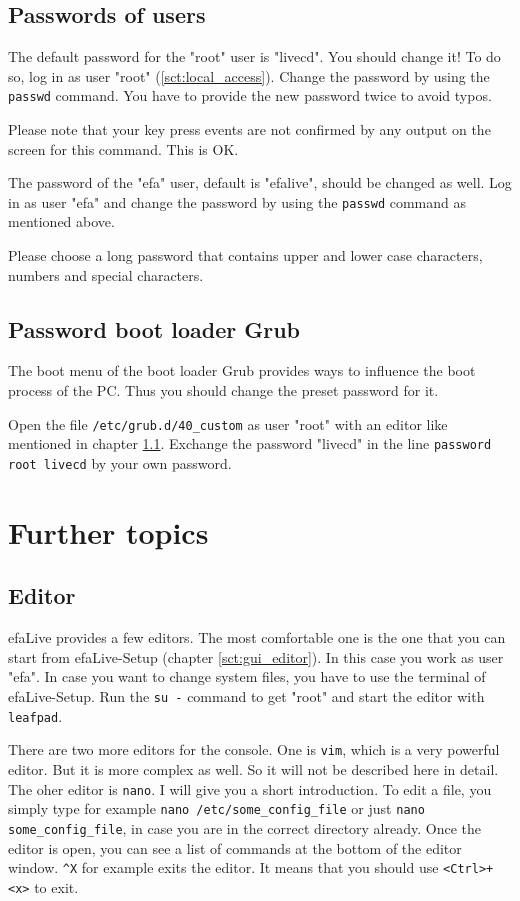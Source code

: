 \documentclass[a4paper,12pt,twoside]{article}
\begin{document}
\subsection{Passwords of users}
\label{sct:password_admin}
The default password for the "root" user is
"livecd". You should change it! To do so,
log in as user "root" (\ref{sct:local_access}). Change the
password by using the \texttt{passwd} command. You
have to provide the new password twice to avoid typos.

Please note that your key press events are not confirmed by any output
on the screen for this command. This is OK.

The password of the "efa" user, default is "efalive", should be changed as well. 
Log in as user "efa" and change the password by using the \texttt{passwd} command
as mentioned above.

Please choose a long password that contains upper and lower case
characters, numbers and special characters.


\subsection{Password boot loader Grub}
\label{sct:password_grub}
The boot menu of the boot loader Grub \cite{GRB1} provides ways to
influence the boot process of the PC. Thus you should change the preset
password for it.

Open the file \texttt{/etc/grub.d/40\_custom} as user
"root" with an editor like mentioned in
chapter \ref{sct:editor}. Exchange the password "livecd"
in the line \texttt{password root livecd} by your
own password.


\section{Further topics}
\label{sct:further_topics}
\subsection{Editor}
\label{sct:editor}
efaLive provides a few editors. The
most comfortable one is the one that you can start from efaLive-Setup
(chapter \ref{sct:gui_editor}). In this case you work as user
"efa". In case you want to change system
files, you have to use the terminal of efaLive-Setup. Run the
\texttt{su -} command to get
"root" and start the editor with
\texttt{leafpad}. 

There are two more editors for the console. One is
\texttt{vim}, which is a very powerful editor. But
it is more complex as well. So it will not be described here in detail.
The oher editor is \texttt{nano}. I will give you
a short introduction. To edit a file, you simply type for example
\texttt{nano /etc/some\_config\_file} or
just \texttt{nano some\_config\_file}, in case you are
in the correct directory already. Once the editor is open, you can see
a list of commands at the bottom of the editor window.
\texttt{\^{}X} for example exits the editor. It
means that you should use
\texttt{{\textless}Ctrl{\textgreater}+{\textless}x{\textgreater}} to exit.
\end{document}
